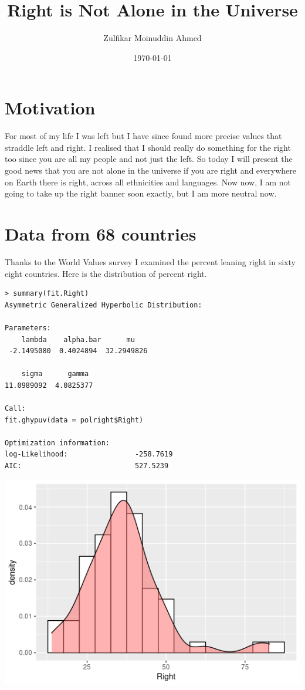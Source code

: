 \documentclass{amsart}
\title{Right is Not Alone in the Universe}
\author{Zulfikar Moinuddin Ahmed}
\date{\today}
\begin{document}
\maketitle
\section{Motivation}
For most of my life I was left but I have since found more precise values that straddle left and right.  I realised that I should really do something for the right too since you are all my people and not just the left.  So today I will present the good news that you are not alone in the universe if you are right and everywhere on Earth there is right, across all ethnicities and languages.  Now now, I am not going to take up the right banner soon exactly, but I am more neutral now.

\section{Data from 68 countries}

Thanks to the World Values survey I examined the percent leaning right in sixty eight countries.  Here is the distribution of percent right.

\begin{verbatim}
> summary(fit.Right)
Asymmetric Generalized Hyperbolic Distribution:

Parameters:
    lambda    alpha.bar      mu
 -2.1495080  0.4024894  32.2949826 
 
    sigma      gamma 
11.0989092  4.0825377 

Call:
fit.ghypuv(data = polright$Right)

Optimization information:
log-Likelihood:                -258.7619 
AIC:                           527.5239
\end{verbatim}

\includegraphics[scale=0.7]{right.png}
\end{document}
